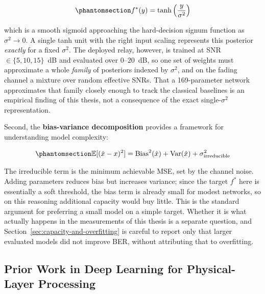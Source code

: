 \begin{equation}\protect\phantomsection\label{eq:optimal-denoiser-awgn}{f^*(y) = \tanh\left(\frac{y}{\sigma^2}\right)
}\end{equation}

which is a smooth sigmoid approaching the hard-decision signum function as \(\sigma^2 \to 0\). A single tanh unit with the right input scaling represents this posterior \emph{exactly} for a fixed \(\sigma^2\). The deployed relay, however, is trained at SNR \(\in\{5,10,15\}\)~dB and evaluated over \(0\)--\(20\)~dB, so one set of weights must approximate a whole \emph{family} of posteriors indexed by \(\sigma^2\), and on the fading channel a mixture over random effective SNRs. That a 169-parameter network approximates that family closely enough to track the classical baselines is an empirical finding of this thesis, not a consequence of the exact single-\(\sigma^2\) representation.

Second, the \textbf{bias-variance decomposition} provides a framework for understanding model complexity:

\begin{equation}\protect\phantomsection\label{eq:bias-variance-decomp}{\mathbb{E}[(\hat{x} - x)^2] = \text{Bias}^2(\hat{x}) + \text{Var}(\hat{x}) + \sigma^2_{\text{irreducible}}
}\end{equation}

The irreducible term is the minimum achievable MSE, set by the channel noise. Adding parameters reduces bias but increases variance; since the target \(f^*\) here is essentially a soft threshold, the bias term is already small for modest networks, so on this reasoning additional capacity would buy little. This is the standard argument for preferring a small model on a simple target. Whether it is what actually happens in the measurements of this thesis is a separate question, and Section~\ref{sec:capacity-and-overfitting} is careful to report only that larger evaluated models did not improve BER, without attributing that to overfitting.

\subsection{Prior Work in Deep Learning for Physical-Layer Processing}\label{sec:prior-work-in-deep-learning-for-physical-layer-processing}

